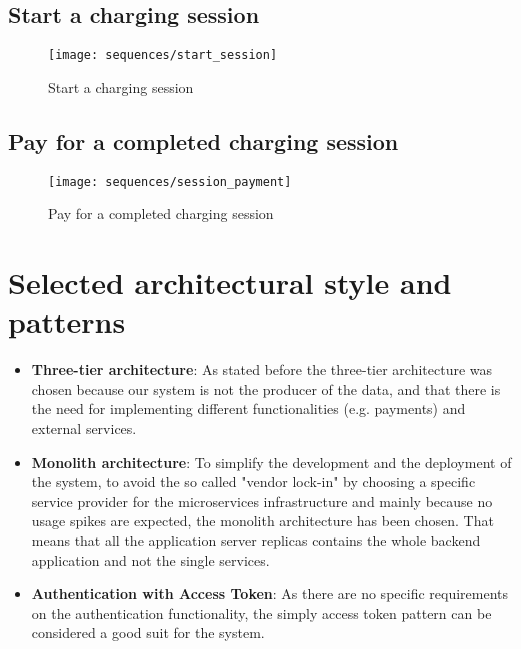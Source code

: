 \subsection{Start a charging session}
\begin{figure}[h]
\texttt{[image: sequences/start\_session]}
\caption{Start a charging session}
\end{figure}
\clearpage

\subsection{Pay for a completed charging session}
\begin{figure}[h]
\texttt{[image: sequences/session\_payment]}
\caption{Pay for a completed charging session}
\end{figure}
\clearpage

\section{Selected architectural style and patterns}
\begin{itemize}
	\item \textbf{Three-tier architecture}: As stated before the three-tier architecture was chosen because our system is not the producer of the data, and that there is the need for implementing different functionalities (e.g. payments) and external services.
	\item \textbf{Monolith architecture}: To simplify the development and the deployment of the system, to avoid the so called "vendor lock-in" by choosing a specific service provider for the microservices infrastructure and mainly because no usage spikes are expected, the monolith architecture has been chosen. That means that all the application server replicas contains the whole backend application and not the single services.
	\item \textbf{Authentication with Access Token}: As there are no specific requirements on the authentication functionality, the simply access token pattern can be considered a good suit for the system. 
\end{itemize}











